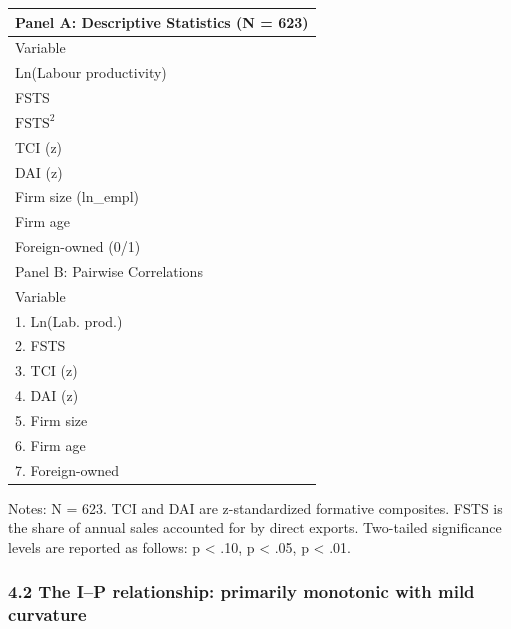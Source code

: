\documentclass[12pt,a4paper]{article}
\begin{document}
\begin{longtable}[]{@{}l@{}}
\toprule\noalign{}
Panel A: Descriptive Statistics (N = 623) \\
\midrule\noalign{}
\endhead
\bottomrule\noalign{}
\endlastfoot
Variable \\
Ln(Labour productivity) \\
FSTS \\
\(\mathrm{FSTS}^2\) \\
TCI (z) \\
DAI (z) \\
Firm size (ln\_empl) \\
Firm age \\
Foreign-owned (0/1) \\
Panel B: Pairwise Correlations \\
Variable \\
1. Ln(Lab. prod.) \\
2. FSTS \\
3. TCI (z) \\
4. DAI (z) \\
5. Firm size \\
6. Firm age \\
7. Foreign-owned \\
\end{longtable}

Notes: N = 623. TCI and DAI are z-standardized formative composites.
FSTS is the share of annual sales accounted for by direct exports.
Two-tailed significance levels are reported as follows: p \textless{}
.10, p \textless{} .05, p \textless{} .01.

\hypertarget{42-the-ip-relationship-primarily-monotonic-with-mild-curvature}{%
\subsubsection{4.2 The I--P relationship: primarily monotonic with mild
curvature}\label{42-the-ip-relationship-primarily-monotonic-with-mild-curvature}}
\end{document}

